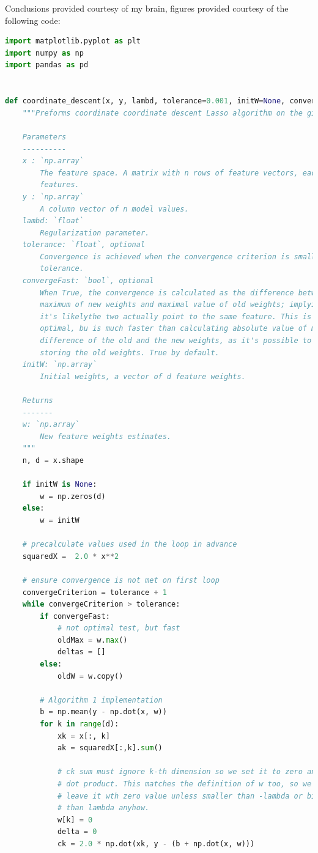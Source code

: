 \documentclass{article}
\newcommand{\1}{\mathbf{1}}
\begin{document}
\begin{enumerate}
Conclusions provided courtesy of my brain, figures provided courtesy of the following code:
    
\begin{lstlisting}[language=Python]
import matplotlib.pyplot as plt
import numpy as np
import pandas as pd


def coordinate_descent(x, y, lambd, tolerance=0.001, initW=None, convergeFast=True):
    """Preforms coordinate coordinate descent Lasso algorithm on the given data.

    Parameters
    ----------
    x : `np.array`
        The feature space. A matrix with n rows of feature vectors, each with d
        features.
    y : `np.array`
        A column vector of n model values.
    lambd: `float`
        Regularization parameter.
    tolerance: `float`, optional
        Convergence is achieved when the convergence criterion is smaller than
        tolerance.
    convergeFast: `bool`, optional
        When True, the convergence is calculated as the difference between
        maximum of new weights and maximal value of old weights; implying that
        it's likelythe two actually point to the same feature. This is not
        optimal, bu is much faster than calculating absolute value of minimal
        difference of the old and the new weights, as it's possible to avoid
        storing the old weights. True by default.
    initW: `np.array`
        Initial weights, a vector of d feature weights.

    Returns
    -------
    w: `np.array`
        New feature weights estimates. 
    """
    n, d = x.shape

    if initW is None:
        w = np.zeros(d)
    else:
        w = initW

    # precalculate values used in the loop in advance
    squaredX =  2.0 * x**2

    # ensure convergence is not met on first loop
    convergeCriterion = tolerance + 1
    while convergeCriterion > tolerance:
        if convergeFast:
            # not optimal test, but fast
            oldMax = w.max()
            deltas = []
        else:
            oldW = w.copy()

        # Algorithm 1 implementation
        b = np.mean(y - np.dot(x, w))
        for k in range(d):
            xk = x[:, k]
            ak = squaredX[:,k].sum()

            # ck sum must ignore k-th dimension so we set it to zero and use
            # dot product. This matches the definition of w too, so we can
            # leave it wth zero value unless smaller than -lambda or bigger
            # than lambda anyhow. 
            w[k] = 0
            delta = 0
            ck = 2.0 * np.dot(xk, y - (b + np.dot(x, w)))


\end{lstlisting}
\end{enumerate}
\end{document}
